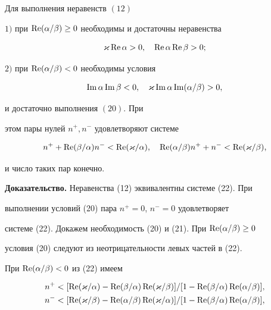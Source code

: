 \begin{thm}


Для выполнения неравенств $(12)$





$1)$ при $\operatorname{Re}(\alpha/\beta) \ge 0$ необходимы и достаточны неравенства


\begin{equation}


\varkappa\re\alpha >0,\quad \re\alpha \re\beta >0;


\end{equation}





$2)$ при $\operatorname{Re}(\alpha/\beta) < 0$ необходимы условия


\begin{equation}


\im\alpha \im\beta <0,\quad


\varkappa \im\alpha\im(\alpha/\beta)>0,


\end{equation}


и достаточно выполнения $(20)$. При


этом пары нулей $n^{+},n^{-}$ удовлетворяют системе


\begin{equation}


n^{+} +\re(\beta/\alpha)n^{-}<\re(\varkappa/\alpha),\quad


\re(\alpha/\beta)n^{+} +


n^{-}<\re(\varkappa/\beta),


\end{equation}


и число таких пар конечно.


\end{thm}





{\bf Доказательство.} Неравенства (12) эквивалентны системе (22). При


выполнении условий (20) пара $n^{+}=0$, $n^{-}=0$ удовлетворяет


системе (22). Докажем необходимость (20) и (21). При $\operatorname{Re}(\alpha/\beta)\ge 0$


условия (20) следуют из неотрицательности левых частей в (22).


При $\operatorname{Re}(\alpha/\beta)<0$ из (22) имеем


\begin{align*}


n^{+}&<[\re(\varkappa/\alpha)-\re(\beta/\alpha)


\re(\varkappa/\beta)]/[1-\re(\beta/\alpha)\re(\alpha/\beta)], \\


%


n^{-}&<[\re(\varkappa/\beta)-\re(\alpha/\beta)


\re(\varkappa/\alpha)]/[1-\re(\beta/\alpha)\re(\alpha/\beta)],


\end{align*}


